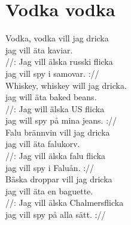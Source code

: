 \section{Vodka vodka}
Vodka, vodka vill jag dricka\\
jag vill äta kaviar.\\
//: Jag vill älska russki flicka\\
jag vill spy i samovar. ://\\

Whiskey, whiskey will jag dricka.\\
jag will äta baked beans.\\
//: Jag will älska US flicka\\
jag will spy på mina jeans. ://\\

Falu brännvin vill jag dricka\\
jag vill äta falukorv.\\
//: Jag vill älska falu flicka\\
jag vill spy i Faluån. ://\\

Bäska droppar vill jag dricka\\
jag vill äta en baguette.\\
//: Jag vill älska Chalmersflicka\\
jag vill spy på alla sätt. ://\\